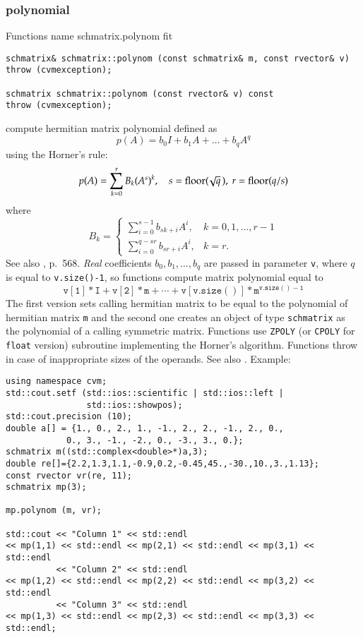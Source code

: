 \subsubsection{polynomial}
Functions%
\pdfdest name {schmatrix.polynom} fit
\begin{verbatim}
schmatrix& schmatrix::polynom (const schmatrix& m, const rvector& v)
throw (cvmexception);

schmatrix schmatrix::polynom (const rvector& v) const
throw (cvmexception);
\end{verbatim}
compute  hermitian matrix polynomial defined as
\begin{equation*}
p(A)=b_0I+b_1A+\dots+b_qA^q
\end{equation*}
using the Horner's rule:
\begin{equation*}
p(A)=\sum_{k=0}^r B_k(A^s)^k,\quad s=\operatorname{floor}(\!\sqrt{q}\,),\ r=\operatorname{floor}(q/s)
\end{equation*}
where
\begin{equation*}
B_k=\begin{cases}
\sum\limits_{i=0}^{s-1}b_{sk+i} A^i, & k=0,1,\dots,r-1\\
\sum\limits_{i=0}^{q-sr}b_{sr+i} A^i, & k=r.
\end{cases}
\end{equation*}
See also , p.~568.
\emph{Real} coefficients $b_0,b_1,\dots,b_q$ are 
passed in  parameter \verb"v",
where $q$ is equal to \verb"v.size()-1", so  functions
compute matrix polynomial equal to
\begin{equation*}
\mathtt{v[1]*I + v[2]*m +\cdots + v[v.size()]*m^{v.size()-1}}
\end{equation*}
The first version sets calling hermitian matrix to be equal 
to the polynomial of hermitian matrix \verb"m"
and the second one
creates an object of type \verb"schmatrix" as the 
polynomial of a calling symmetric matrix.
Functions use \verb"ZPOLY" (or \verb"CPOLY" for \verb"float" version)
\FORTRAN subroutine implementing the Horner's algorithm.
Functions throw   
in case of inappropriate sizes of the operands.
See also
.
Example:
\begin{Verbatim}
using namespace cvm;
std::cout.setf (std::ios::scientific | std::ios::left |
                std::ios::showpos);
std::cout.precision (10);
double a[] = {1., 0., 2., 1., -1., 2., 2., -1., 2., 0.,
            0., 3., -1., -2., 0., -3., 3., 0.};
schmatrix m((std::complex<double>*)a,3);
double re[]={2.2,1.3,1.1,-0.9,0.2,-0.45,45.,-30.,10.,3.,1.13};
const rvector vr(re, 11);
schmatrix mp(3);

mp.polynom (m, vr);

std::cout << "Column 1" << std::endl
<< mp(1,1) << std::endl << mp(2,1) << std::endl << mp(3,1) << std::endl
          << "Column 2" << std::endl
<< mp(1,2) << std::endl << mp(2,2) << std::endl << mp(3,2) << std::endl
          << "Column 3" << std::endl
<< mp(1,3) << std::endl << mp(2,3) << std::endl << mp(3,3) << std::endl;
\end{Verbatim}
